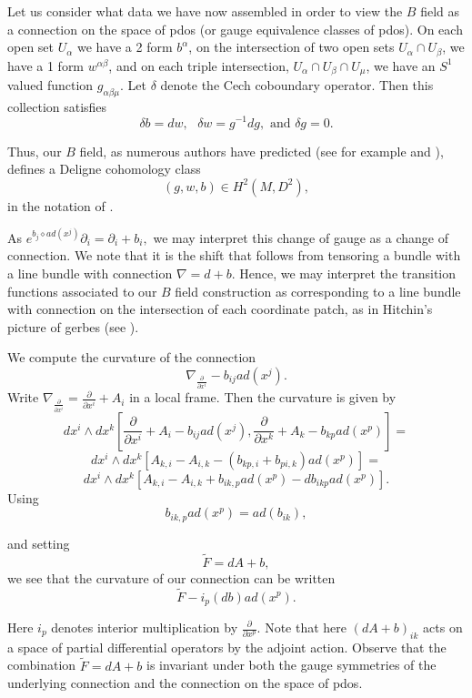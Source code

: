 \documentclass[a4paper,11pt]{amsart}
\begin{document}
Let us consider what data we have now assembled in order to view 
the $B$ field as a connection on the space of pdos (or gauge equivalence
classes of pdos). On each open set $U_{\alpha}$ we have a 2 form $b^{\alpha}$, 
on the intersection of two open sets $U_{\alpha} \cap U_{\beta}$, 
we have a 1 form $w^{\alpha\beta}$, and on each triple intersection,
$U_{\alpha}\cap U_{\beta}\cap U_{\mu}$, we have 
an $S^1$ valued function $g_{\alpha\beta\mu}.$ Let $\delta$ denote the 
Cech coboundary operator. Then this collection satisfies 
$$\delta b = d w, \mbox{   }\delta w = g^{-1}dg, \mbox{  and  } \delta g = 0.$$

Thus, our $B$ field, as numerous authors have predicted (see for example 
 \cite{FW} and \cite{KO}), defines a Deligne cohomology class 
$$(g,w,b)\in H^2(M,D^2),$$
in the notation of \cite{CJM}. 
  
      As $e^{b_j \diamond ad(x^j)}\partial_i = \partial_i + b_i,$ 
 we may interpret this change of gauge as 
a change of connection.  We note that it is the shift that
  follows from tensoring a bundle with a line bundle with connection 
  $\nabla = d + b.$  
  Hence, we may interpret the transition functions associated to our $B$ field 
  construction as corresponding to 
a line bundle with connection on the intersection of each coordinate patch,
 as in Hitchin's picture of gerbes (see \cite{H}). 
 
   
We compute the curvature of the connection 
$$\nabla_{\frac{\partial}{\partial x^i}} - b_{ij}ad(x^j).$$
Write $\nabla_{\frac{\partial}{\partial x^i}} = \frac{\partial}{\partial x^i}
 + A_i$ in a local frame. Then the curvature is given by 
 $$dx^i\wedge dx^k[\frac{\partial}{\partial x^i} + A_i - b_{ij}ad(x^j),
\frac{\partial}{\partial x^k} + A_k - b_{kp}ad(x^p)] = $$
$$dx^i\wedge dx^k[A_{k,i} - A_{i,k} - (b_{kp,i}+ b_{pi,k})ad(x^p)] =$$
$$dx^i\wedge dx^k[A_{k,i} - A_{i,k} + b_{ik,p}ad(x^p) - db_{ikp}ad(x^p)].$$ 
Using 
$$b_{ik,p}ad(x^p) = ad(b_{ik}),$$

and setting 
$$\tilde F = dA + b,$$
we see that the curvature of our connection can be written 
$$\tilde F - i_p(db)ad(x^p).$$   

Here $i_p$ denotes interior multiplication by $\frac{\partial}{\partial x^p}$. 
Note that here $(dA + b)_{ik}$ acts on a space of partial differential operators by 
the adjoint action. Observe that the combination $\tilde F = dA + b$ is
invariant under both the gauge symmetries of the underlying connection and the
connection on the space of pdos. 
\end{document}
